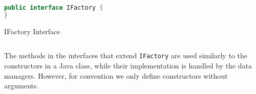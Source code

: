 \begin{sourcecode} [H]
	\begin{lstlisting}[language=Java, escapechar=|]
public interface IFactory {
}
	\end{lstlisting}
	\caption{IFactory Interface}
	\label{lst:IFactory}
\end{sourcecode}

The methods in the interfaces that extend \texttt{IFactory} are used similarly to the constructors in a Java class, while their implementation is handled by the data managers.
However, for convention we only define constructors without arguments.




